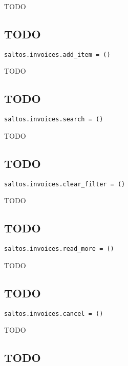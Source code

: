 \documentclass[a4paper]{book}
\begin{document}
TODO

\hypertarget{toc577}{}
\subsection{TODO}

\begin{lstlisting}
saltos.invoices.add_item = ()
\end{lstlisting}

TODO

\hypertarget{toc578}{}
\subsection{TODO}

\begin{lstlisting}
saltos.invoices.search = ()
\end{lstlisting}

TODO

\hypertarget{toc579}{}
\subsection{TODO}

\begin{lstlisting}
saltos.invoices.clear_filter = ()
\end{lstlisting}

TODO

\hypertarget{toc580}{}
\subsection{TODO}

\begin{lstlisting}
saltos.invoices.read_more = ()
\end{lstlisting}

TODO

\hypertarget{toc581}{}
\subsection{TODO}

\begin{lstlisting}
saltos.invoices.cancel = ()
\end{lstlisting}

TODO

\hypertarget{toc582}{}
\subsection{TODO}
\end{document}
